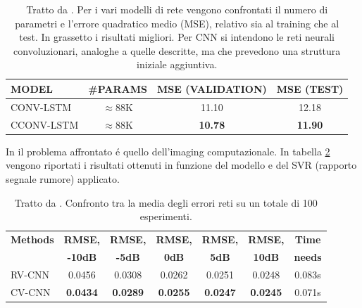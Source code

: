 \documentclass[a4paper,12pt]{report}
\begin{document}
 \begin{table}[h]
  \centering
  \begin{tabular}{l c c c}
   \hline
   \textbf{MODEL} & \textbf{\#PARAMS} & \textbf{MSE (VALIDATION)} & \textbf{MSE (TEST)} \\
   \hline
   CONV-LSTM & $\approx$88K & 11.10 & 12.18\\
   \hline
   CCONV-LSTM & $\approx$88K & \textbf{10.78} & \textbf{11.90} \\
   \hline
  \end{tabular}
  \caption{Tratto da \cite{trabelsi2017deep}. Per i vari modelli di rete vengono confrontati il numero di parametri e l'errore quadratico medio (MSE), relativo sia al training che al test. In grassetto i risultati migliori. Per CNN si intendono le reti neurali convoluzionari, analoghe a quelle descritte, ma che prevedono una struttura iniziale aggiuntiva.}
  \label{SpeechSpectPredTab}
 \end{table}
 
 
 In \cite{gao2018enhanced} il problema affrontato \'e quello dell'imaging computazionale. In tabella \ref{SVRTab} vengono riportati i risultati ottenuti in funzione del modello e del SVR (rapporto segnale rumore) applicato.
 \begin{table}[h]
  \centering
  \begin{tabular}{l c c c c c c}
   \hline
   \textbf{Methods} & \textbf{RMSE,} & \textbf{RMSE,} & \textbf{RMSE,} & \textbf{RMSE,} & \textbf{RMSE,} & \textbf{Time} \\
    & \textbf{-10dB} & \textbf{-5dB} & \textbf{0dB} & \textbf{5dB} & \textbf{10dB} & \textbf{needs} \\
    \hline
    RV-CNN & 0.0456 & 0.0308 & 0.0262 & 0.0251 & 0.0248 & 0.083s\\
    \hline
    CV-CNN & \textbf{0.0434} & \textbf{0.0289} & \textbf{0.0255} & \textbf{0.0247} & \textbf{0.0245} & 0.071s\\
    \hline
  \end{tabular}
  \caption{Tratto da \cite{gao2018enhanced}. Confronto tra la media degli errori reti su un totale di 100 esperimenti.}
  \label{SVRTab}
 \end{table}
 
\end{document}
